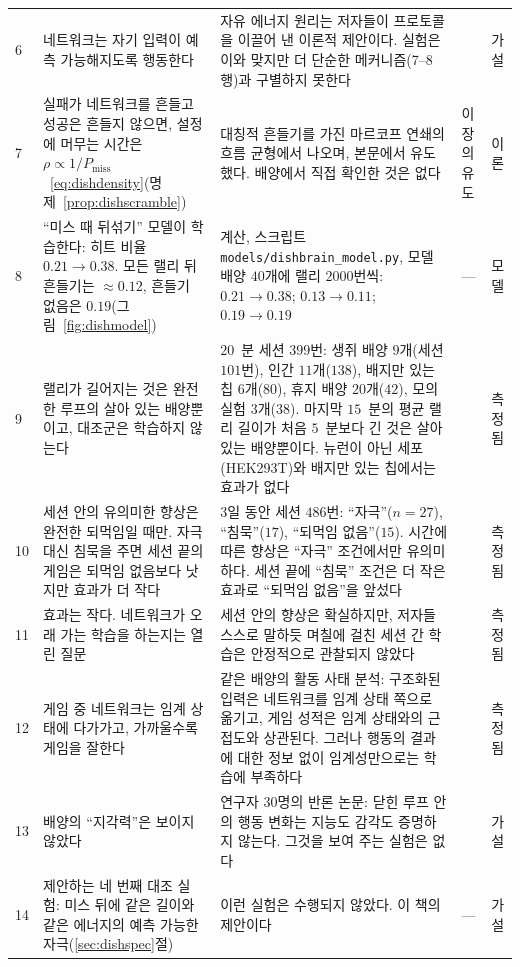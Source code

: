 {\begin{longtable}{>{\raggedright}p{0.5cm}>{\raggedright}p{4.0cm}>{\raggedright}p{5.6cm}>{\raggedright}p{2.3cm}>{\raggedright\arraybackslash}p{1.7cm}}
6 & 네트워크는 자기 입력이 예측 가능해지도록 행동한다 & 자유 에너지 원리는 저자들이 프로토콜을 이끌어 낸 이론적 제안이다. 실험은 이와 맞지만 더 단순한 메커니즘(7--8행)과 구별하지 못한다 & \cite{Friston2010,Kagan2022} & 가설 \\
7 & 실패가 네트워크를 흔들고 성공은 흔들지 않으면, 설정에 머무는 시간은 $\rho\propto1/P_{\text{miss}}$~\eqref{eq:dishdensity}(명제~\ref{prop:dishscramble}) & 대칭적 흔들기를 가진 마르코프 연쇄의 흐름 균형에서 나오며, 본문에서 유도했다. 배양에서 직접 확인한 것은 없다 & 이 장의 유도 & 이론 \\
8 & “미스 때 뒤섞기” 모델이 학습한다: 히트 비율 $0.21\to0.38$. 모든 랠리 뒤 흔들기는 $\approx0.12$, 흔들기 없음은 $0.19$(그림~\ref{fig:dishmodel}) & 계산, 스크립트 \texttt{models/dishbrain\_model.py}, 모델 배양 $40$개에 랠리 $2000$번씩: $0.21\to0.38$; $0.13\to0.11$; $0.19\to0.19$ & --- & 모델 \\
9 & 랠리가 길어지는 것은 완전한 루프의 살아 있는 배양뿐이고, 대조군은 학습하지 않는다 & $20$~분 세션 $399$번: 생쥐 배양 $9$개(세션 $101$번), 인간 $11$개($138$), 배지만 있는 칩 $6$개($80$), 휴지 배양 $20$개($42$), 모의실험 $3$개($38$). 마지막 $15$~분의 평균 랠리 길이가 처음 $5$~분보다 긴 것은 살아 있는 배양뿐이다. 뉴런이 아닌 세포(HEK293T)와 배지만 있는 칩에서는 효과가 없다 & \cite{Kagan2022} & 측정됨 \\
10 & 세션 안의 유의미한 향상은 완전한 되먹임일 때만. 자극 대신 침묵을 주면 세션 끝의 게임은 되먹임 없음보다 낫지만 효과가 더 작다 & $3$일 동안 세션 $486$번: “자극”($n=27$), “침묵”($17$), “되먹임 없음”($15$). 시간에 따른 향상은 “자극” 조건에서만 유의미하다. 세션 끝에 “침묵” 조건은 더 작은 효과로 “되먹임 없음”을 앞섰다 & \cite{Kagan2022} & 측정됨 \\
11 & 효과는 작다. 네트워크가 오래 가는 학습을 하는지는 열린 질문 & 세션 안의 향상은 확실하지만, 저자들 스스로 말하듯 며칠에 걸친 세션 간 학습은 안정적으로 관찰되지 않았다 & \cite{Kagan2022} & 측정됨 \\
12 & 게임 중 네트워크는 임계 상태에 다가가고, 가까울수록 게임을 잘한다 & 같은 배양의 활동 사태 분석: 구조화된 입력은 네트워크를 임계 상태 쪽으로 옮기고, 게임 성적은 임계 상태와의 근접도와 상관된다. 그러나 행동의 결과에 대한 정보 없이 임계성만으로는 학습에 부족하다 & \cite{Habibollahi2023} & 측정됨 \\
13 & 배양의 “지각력”은 보이지 않았다 & 연구자 30명의 반론 논문: 닫힌 루프 안의 행동 변화는 지능도 감각도 증명하지 않는다. 그것을 보여 주는 실험은 없다 & \cite{Balci2023} & 가설 \\
14 & 제안하는 네 번째 대조 실험: 미스 뒤에 같은 길이와 같은 에너지의 예측 가능한 자극(\ref{sec:dishspec}절) & 이런 실험은 수행되지 않았다. 이 책의 제안이다 & --- & 가설 \\
\bottomrule
\end{longtable}}
